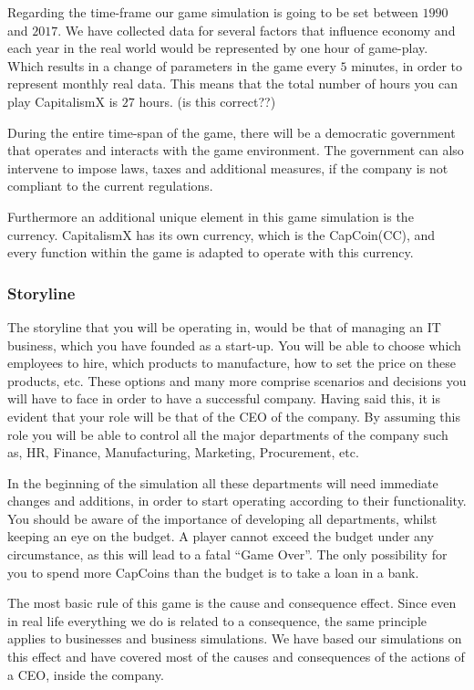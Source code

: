 \documentclass[11pt,titlepage,oneside,openany]{book}
\begin{document}
Regarding the time-frame our game simulation is going to be set between $1990$ and $2017$. We have collected data for several factors that influence economy and each year in the real world would be represented by one hour of game-play. Which results in a change of parameters in the game every $5$ minutes, in order to represent monthly real data. This means that the total number of hours you can play CapitalismX is $27$ hours. (is this correct??) 

During the entire time-span of the game, there will be a democratic government that operates and interacts with the game environment. The government can also intervene to impose laws, taxes and additional measures, if the company is not compliant to the current regulations. 

Furthermore an additional unique element in this game simulation is the currency. CapitalismX has its own currency, which is the CapCoin(CC), and every function within the game is adapted to operate with this currency.
\subsubsection{Storyline}
 The storyline that you will be operating in, would be that of managing an IT business, which you have founded as a start-up. You will be able to choose which employees to hire, which products to manufacture,  how to set the price on these products, etc. These options and many more comprise scenarios and decisions you will have to face in order to have a successful company. Having said this, it is evident that your role will be that of the CEO of the company. By assuming this role you will be able to control all the major departments of the company such as, HR, Finance, Manufacturing, Marketing, Procurement, etc. 
 
In the beginning of the simulation all these departments will need immediate changes and additions, in order to start operating according to their functionality. You should be aware of the importance of developing all departments, whilst keeping an eye on the budget. A player cannot exceed the budget under any circumstance, as this will lead to a fatal “Game Over”. The only possibility for you to spend more CapCoins than the budget is to take a loan in a bank. 

The most basic rule of this game is the cause and consequence effect. Since even in real life everything we do is related to a consequence, the same principle applies to businesses and business simulations. We have based our simulations on this effect and have covered most of the causes and consequences of the actions of a CEO, inside the company. 
\end{document}
